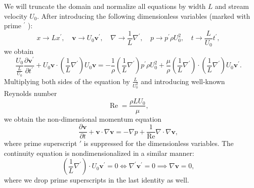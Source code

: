 \documentclass{article}
\begin{document}
We will truncate the domain and normalize all equations by width $L$ and stream velocity $U_0$. After introducing the following dimensionless variables (marked with prime ${ }^{\prime}$ ):
\begin{equation*}
	x\to Lx^{\prime},  \quad 
	\boldsymbol{v}\to U_0\boldsymbol{v}^{\prime}, \quad 
	\nabla\to \frac{1}{L}\nabla^{\prime}, \quad 
	p\to p^{\prime} \rho U_0^2, \quad 
	t\to \frac{L}{U_0}t^{\prime},
\end{equation*}
we obtain
\begin{equation*}
	\frac{U_0}{\frac{L}{U_0}} \frac{\partial \boldsymbol{v}^{\prime}}{\partial t^{\prime}}+U_0\boldsymbol{v}\cdot\left(\frac{1}{L} \nabla^{\prime}\right) U_0\boldsymbol{v}=-\frac{1}{\rho}\left(\frac{1}{L} \nabla^{\prime}\right){p^{\prime}\rho U^2_0}+\frac{\mu}{\rho} \left(\frac{1}{L} \nabla^{\prime}\right) \cdot\left(\frac{1}{L} \nabla^{\prime}\right) U_0\boldsymbol{v}^{\prime}.
\end{equation*}
Multiplying both sides of the equation by $\frac{L}{U_0^2}$ and introducing well-known Reynolds number 
\begin{equation*}
\operatorname{Re}=\frac{\rho L U_0}{\mu},
\end{equation*}
we obtain the non-dimensional momentum equation
\begin{equation*}
	\frac{\partial \boldsymbol{v}}{\partial t} + \boldsymbol{v} \cdot \nabla \boldsymbol{v} = -\nabla p + \frac{1}{\operatorname{Re}} \nabla \cdot \nabla \boldsymbol{v},
\end{equation*}
where prime superscript $\prime$ is suppressed for the dimensionless variables. The continuity equation is nondimensionalized in a similar manner:
\begin{equation*}
	\left(\frac{1}{L} \nabla^{\prime}\right) \cdot U_0\boldsymbol{v}^{\prime}=0\iff\nabla^{\prime}\boldsymbol{v}^{\prime}=0\implies\nabla\boldsymbol{v}=0,
\end{equation*}
where we drop prime superscripts in the last identity as well.
\end{document}
